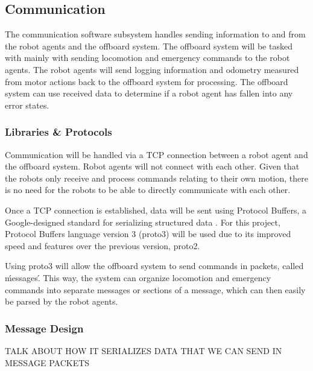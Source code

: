 
\subsection{Communication}
\label{sec:software_comm}

The communication software subsystem handles sending information to and from the robot agents and the offboard system. The offboard system will be tasked with mainly with sending locomotion and emergency commands to the robot agents. The robot agents will send logging information and odometry measured from motor actions back to the offboard system for processing. The offboard system can use received data to determine if a robot agent has fallen into any error states.

\subsubsection{Libraries & Protocols}
\label{sec:software_comm_libs}
Communication will be handled via a TCP connection between a robot agent and the offboard system. Robot agents will not connect with each other. Given that the robots only receive and process commands relating to their own motion, there is no need for the robots to be able to directly communicate with each other. 

Once a TCP connection is established, data will be sent using Protocol Buffers, a Google-designed standard for serializing structured data \cite{protobuf3}. For this project, Protocol Buffers language version 3 (proto3) will be used due to its improved speed and features over the previous version, proto2. 

Using proto3 will allow the offboard system to send commands in packets, called \'messages\'. This way, the system can organize locomotion and emergency commands into separate messages or sections of a message, which can then easily be parsed by the robot agents. 

\subsubsection{Message Design}
\label{sec:software_comm_msg}



TALK ABOUT HOW IT SERIALIZES DATA THAT WE CAN SEND IN MESSAGE PACKETS 
